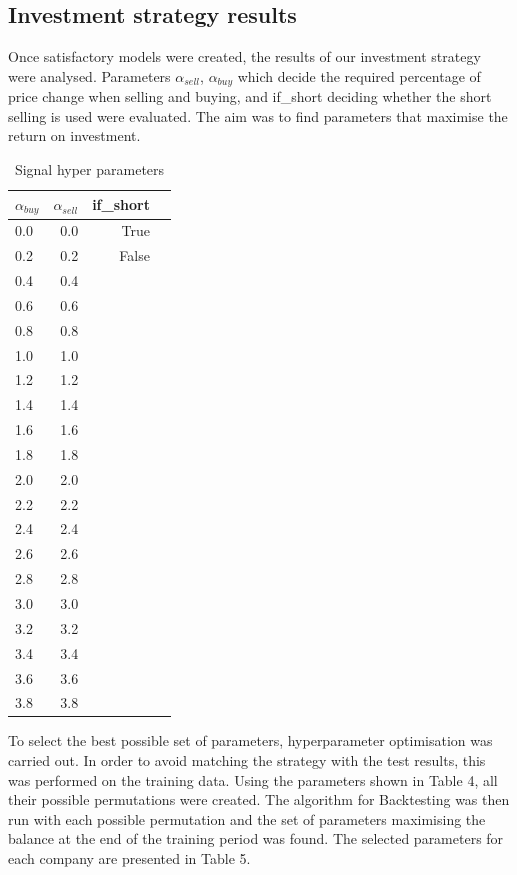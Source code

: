 \documentclass[11pt]{article} %
\begin{document}
\subsection{Investment strategy results}
Once satisfactory models were created, the results of our investment strategy were analysed. Parameters  $\alpha_{sell}$, $\alpha_{buy}$  which decide the required percentage of price change when selling and buying, and if\_short deciding whether the short selling is used were evaluated. The aim was to find parameters that maximise the return on investment.

\begin{table}[H]
\centering
\caption{Signal hyper parameters}
\begin{tabular}{lrrl}
\toprule
  $\alpha_{buy}$ &  $\alpha_{sell}$  & if\_short \\
\midrule
        0.0 &           0.0 &     True \\
         0.2 &           0.2 &    False \\
         0.4 &           0.4  \\
         0.6 &           0.6  \\
          0.8 &           0.8  \\
          1.0 &           1.0  \\
          1.2 &           1.2  \\
          1.4 &           1.4  \\
          1.6 &           1.6  \\
          1.8 &           1.8  \\
         2.0 &           2.0  \\
          2.2 &           2.2  \\
          2.4 &           2.4  \\
          2.6 &           2.6  \\
          2.8 &           2.8  \\
          3.0 &           3.0  \\
          3.2 &           3.2  \\
          3.4 &           3.4  \\
          3.6 &           3.6  \\
          3.8 &           3.8  \\
\bottomrule
\end{tabular}
\end{table}

To select the best possible set of parameters, hyperparameter optimisation was carried out. In order to avoid matching the strategy with the test results, this was performed on the training data. Using the parameters shown in Table 4, all their possible permutations were created. The algorithm for Backtesting was then run with each possible permutation and the set of parameters maximising the balance at the end of the training period was found. The selected parameters for each company are presented in Table 5. 
\end{document}
